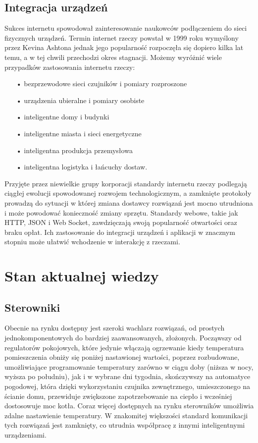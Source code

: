 \documentclass[11pt]{report}
\begin{document}
 \subsection{Integracja urządzeń}
 Sukces internetu spowodował zainteresowanie naukowców podłączeniem do sieci fizycznych urządzeń.
 Termin internet rzeczy powstał w 1999 roku wymyślony przez Kevina Ashtona \cite{Ashton2009} jednak jego popularność rozpoczęła się dopiero kilka lat temu, a w tej chwili przechodzi okres stagnacji.
 Możemy wyróżnić wiele przypadków zastosowania internetu rzeczy:
 \begin{enumerate}
 \item[•] bezprzewodowe sieci czujników i pomiary rozproszone
 \item[•] urządzenia ubieralne i pomiary osobiste
 \item[•] inteligentne domy i budynki \cite{Kwasniewski2011}
 \item[•] inteligentne miasta i sieci energetyczne
 \item[•] inteligentna produkcja przemysłowa
 \item[•] inteligentna logistyka i łańcuchy dostaw.
\end{enumerate}
 Przyjęte przez niewielkie grupy korporacji standardy internetu rzeczy podlegają ciągłej ewolucji spowodowanej rozwojem technologicznym, a zamknięte protokoły prowadzą do sytuacji w której zmiana dostawcy rozwiązań jest mocno utrudniona i może powodować konieczność zmiany sprzętu. Standardy webowe, takie jak HTTP, JSON i Web Socket, zawdzięczają swoją popularność otwartości oraz braku opłat. Ich zastosowanie do integracji urządzeń i aplikacji w znacznym stopniu może ułatwić wchodzenie w interakcję z rzeczami.
 
 \section{Stan aktualnej wiedzy}
 \subsection{Sterowniki}
 Obecnie na rynku dostępny jest szeroki wachlarz rozwiązań, od prostych jednokomponentowych do bardziej zaawansowanych, złożonych. Począwszy od regulatorów pokojowych, które jedynie włączają ogrzewanie kiedy temperatura pomieszczenia obniży się poniżej nastawionej wartości, poprzez rozbudowane, umożliwiające programowanie temperatury zarówno w ciągu doby (niższa w nocy, wyższa po południu), jak i w wybrane dni tygodnia, skończywszy na automatyce pogodowej, która dzięki wykorzystaniu czujnika zewnętrznego, umieszczonego na ścianie domu, przewiduje zwiększone zapotrzebowanie na ciepło i wcześniej dostosowuje moc kotła.
 Coraz więcej dostępnych na rynku sterowników umożliwia zdalne nastawienie temperatury. W znakomitej większości standard komunikacji tych rozwiązań jest zamknięty, co utrudnia współpracę  z innymi inteligentnymi urządzeniami.
\end{document}
